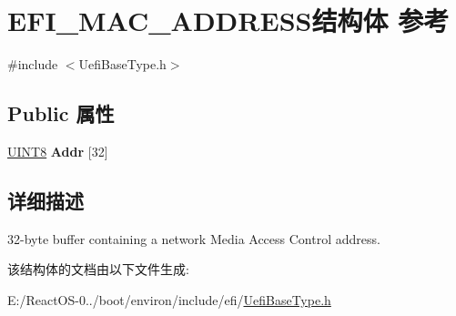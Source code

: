 \hypertarget{struct_e_f_i___m_a_c___a_d_d_r_e_s_s}{}\section{E\+F\+I\+\_\+\+M\+A\+C\+\_\+\+A\+D\+D\+R\+E\+S\+S结构体 参考}
\label{struct_e_f_i___m_a_c___a_d_d_r_e_s_s}


{\ttfamily \#include $<$Uefi\+Base\+Type.\+h$>$}

\subsection*{Public 属性}
\begin{DoxyCompactItemize}
\item 
\mbox{\label{struct_e_f_i___m_a_c___a_d_d_r_e_s_s_a3ed11a3fda3a98de9b1789428efbf32a}} 
\hyperlink{_processor_bind_8h_ab27e9918b538ce9d8ca692479b375b6a}{U\+I\+N\+T8} {\bfseries Addr} \mbox{[}32\mbox{]}
\end{DoxyCompactItemize}


\subsection{详细描述}
32-\/byte buffer containing a network Media Access Control address. 

该结构体的文档由以下文件生成\+:\begin{DoxyCompactItemize}
\item 
E\+:/\+React\+O\+S-\/0../boot/environ/include/efi/\hyperlink{_uefi_base_type_8h}{Uefi\+Base\+Type.\+h}\end{DoxyCompactItemize}
